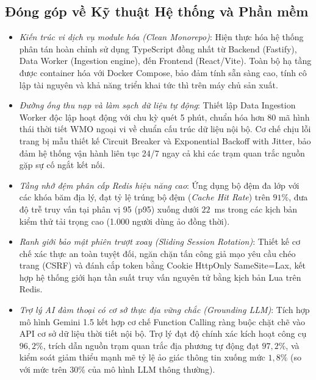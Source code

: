 \subsection{Đóng góp về Kỹ thuật Hệ thống và Phần mềm}
\begin{itemize}
    \item[-] \textit{Kiến trúc vi dịch vụ module hóa (Clean Monorepo)}: Hiện thực hóa hệ thống phân tán hoàn chỉnh sử dụng TypeScript đồng nhất từ Backend (Fastify), Data Worker (Ingestion engine), đến Frontend (React/Vite). Toàn bộ hạ tầng được container hóa với Docker Compose, bảo đảm tính sẵn sàng cao, tính cô lập tài nguyên và khả năng triển khai tức thì trên máy chủ sản xuất.
    \item[-] \textit{Đường ống thu nạp và làm sạch dữ liệu tự động}: Thiết lập Data Ingestion Worker độc lập hoạt động với chu kỳ quét 5 phút, chuẩn hóa hơn 80 mã hình thái thời tiết WMO ngoại vi về chuẩn cấu trúc dữ liệu nội bộ. Cơ chế chịu lỗi trang bị mẫu thiết kế Circuit Breaker và Exponential Backoff with Jitter, bảo đảm hệ thống vận hành liên tục 24/7 ngay cả khi các trạm quan trắc nguồn gặp sự cố ngắt kết nối.
    \item[-] \textit{Tầng nhớ đệm phân cấp Redis hiệu năng cao}: Ứng dụng bộ đệm đa lớp với các khóa băm địa lý, đạt tỷ lệ trúng bộ đệm (\textit{Cache Hit Rate}) trên $91\%$, đưa độ trễ truy vấn tại phân vị 95 (p95) xuống dưới $22$~ms trong các kịch bản kiểm thử tải trọng cao (1.000 người dùng ảo đồng thời).
    \item[-] \textit{Ranh giới bảo mật phiên trượt xoay (Sliding Session Rotation)}: Thiết kế cơ chế xác thực an toàn tuyệt đối, ngăn chặn tấn công giả mạo yêu cầu chéo trang (CSRF) và đánh cắp token bằng Cookie HttpOnly SameSite=Lax, kết hợp hệ thống giới hạn tần suất truy vấn nguyên tử bằng kịch bản Lua trên Redis.
    \item[-] \textit{Trợ lý AI đàm thoại có cơ sở thực địa vững chắc (Grounding LLM)}: Tích hợp mô hình Gemini 1.5 kết hợp cơ chế Function Calling ràng buộc chặt chẽ vào API cơ sở dữ liệu thời tiết nội bộ. Trợ lý đạt độ chính xác kích hoạt công cụ $96,2\%$, trích dẫn nguồn trạm quan trắc địa phương tự động đạt $97,2\%$, và kiểm soát giảm thiểu mạnh mẽ tỷ lệ ảo giác thông tin xuống mức $1,8\%$ (so với mức trên $30\%$ của mô hình LLM thông thường).
\end{itemize}

